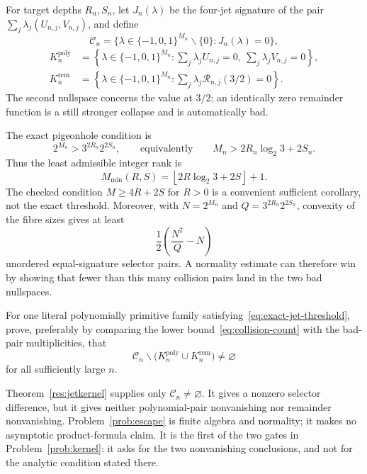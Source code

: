 \documentclass[11pt]{article}
\begin{document}
For target depths $R_n,S_n$, let $J_n(\lambda)$ be the four-jet signature of
the pair $\sum_j\lambda_j(U_{n,j},V_{n,j})$, and define
\[
 \mathcal C_n=
 \{\lambda\in\{-1,0,1\}^{M_n}\mathbin{\backslash}\{0\}:J_n(\lambda)=0\},
\]
\[
\begin{aligned}
 K_n^{\mathrm{poly}}
   &=\left\{\lambda\in\{-1,0,1\}^{M_n}:
       \sum_j\lambda_jU_{n,j}=0,\ \sum_j\lambda_jV_{n,j}=0\right\},\\
 K_n^{\mathrm{rem}}
   &=\left\{\lambda\in\{-1,0,1\}^{M_n}:
       \sum_j\lambda_j\mathcal R_{n,j}(3/2)=0\right\}.
\end{aligned}
\]
The second nullspace concerns the value at $3/2$; an identically zero
remainder function is a still stronger collapse and is automatically bad.

The exact pigeonhole condition is
\[
 2^{M_n}>3^{2R_n}2^{2S_n},
 \qquad\text{equivalently}\qquad
 M_n>2R_n\log_2 3+2S_n.
\tag{8.1}\label{eq:exact-jet-threshold}
\]
Thus the least admissible integer rank is
\[
 M_{\min}(R,S)=
 \left\lfloor2R\log_2 3+2S\right\rfloor+1.
\]
The checked condition $M\ge4R+2S$ for $R>0$ is a convenient sufficient
corollary, not the exact threshold.  Moreover, with
$N=2^{M_n}$ and $Q=3^{2R_n}2^{2S_n}$, convexity of the fibre sizes gives at
least
\[
 \frac12\left(\frac{N^2}{Q}-N\right)
\tag{8.2}\label{eq:collision-count}
\]
unordered equal-signature selector pairs.  A normality estimate can therefore
win by showing that fewer than this many collision pairs land in the two bad
nullspaces.

\begin{problem}\label{prob:escape}
For one literal polynomially primitive family
satisfying~\eqref{eq:exact-jet-threshold},
prove, preferably by comparing the lower bound~\eqref{eq:collision-count} with
the bad-pair multiplicities, that
\[
 \mathcal C_n\mathbin{\backslash}
 \bigl(K_n^{\mathrm{poly}}\cup K_n^{\mathrm{rem}}\bigr)
 \ne\varnothing
\]
for all sufficiently large $n$.
\end{problem}

Theorem~\ref{res:jetkernel} supplies only $\mathcal C_n\ne\varnothing$.
It gives a nonzero selector difference, but it gives neither polynomial-pair
nonvanishing nor remainder nonvanishing.  Problem~\ref{prob:escape} is finite
algebra and normality; it makes no asymptotic product-formula claim.  It is the
first of the two gates in Problem~\ref{prob:kernel}: it asks for the two
nonvanishing conclusions, and not for the analytic condition stated there.
\end{document}
